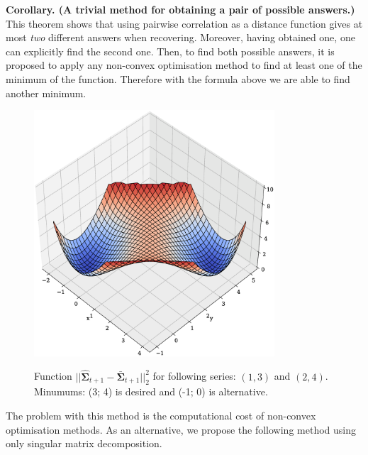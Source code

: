 \documentclass{article}
\begin{document}
\textbf{Corollary. (A trivial method for obtaining a pair of possible answers.)} This theorem shows that using pairwise correlation as a distance function gives at most \textit{two} different answers when recovering. Moreover, having obtained one, one can explicitly find the second one. Then, to find both possible answers, it is proposed to apply any non-convex optimisation method to find at least one of the minimum of the function. Therefore with the formula above we are able to find another minimum.

\begin{figure}[H]
	\centering
	\begin{center}
		\includegraphics[width=0.8\textwidth]{NonConvex.eps}
		\label{fig:fig5}
	\end{center}
	\caption{Function $||\hat{\mathbf{\Sigma}}_{t+1} - \bar{\mathbf{\Sigma}}_{t+1}||_2^2$ for following series: $(1, 3)$ and $(2, 4)$. Minumums: (3; 4) is desired and (-1; 0) is alternative.}
\end{figure}


The problem with this method is the computational cost of non-convex optimisation methods. As an alternative, we propose the following method using only singular matrix decomposition.
\end{document}
